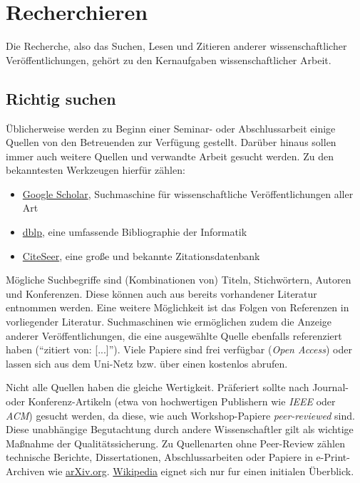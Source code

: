 \section{Recherchieren}
\label{sec:Recherchieren}

Die Recherche, also das Suchen, Lesen und Zitieren anderer wissenschaftlicher Veröffentlichungen, gehört zu den Kernaufgaben wissenschaftlicher Arbeit.

\subsection{Richtig suchen}
\label{sec:Recherchieren:Suchen}

Üblicherweise werden zu Beginn einer Seminar- oder Abschlussarbeit einige Quellen von den Betreuenden zur Verfügung gestellt. 
Darüber hinaus sollen immer auch weitere Quellen und verwandte Arbeit gesucht werden. 
Zu den bekanntesten Werkzeugen hierfür zählen:

\smallskip
\begin{itemize}[label={\symbolTool}]
    \item \href{https://scholar.google.com/}{Google Scholar}, Suchmaschine für wissenschaftliche Veröffentlichungen aller Art
    \item \href{https://dblp.org/}{dblp}, eine umfassende Bibliographie der Informatik
    \item \href{https://citeseerx.ist.psu.edu/}{CiteSeer}, eine große und bekannte Zitationsdatenbank 
\end{itemize}
\smallskip

\noindent
Mögliche Suchbegriffe sind (Kombinationen von) Titeln, Stichwörtern, Autoren und Konferenzen. 
Diese können auch aus bereits vorhandener Literatur entnommen werden. 
Eine weitere Möglichkeit ist das Folgen von Referenzen in vorliegender Literatur. 
Suchmaschinen wie  ermöglichen zudem die Anzeige anderer Veröffentlichungen, die eine ausgewählte Quelle ebenfalls referenziert haben (\enquote{zitiert von: [...]}). 
Viele Papiere sind frei verfügbar (\emph{Open Access}) oder lassen sich aus dem Uni-Netz bzw. über einen  kostenlos abrufen.

Nicht alle Quellen haben die gleiche Wertigkeit. 
Präferiert sollte nach Journal- oder Konferenz-Artikeln (etwa von hochwertigen Publishern wie \emph{IEEE} oder \emph{ACM}) gesucht werden, da diese, wie auch Workshop-Papiere \emph{peer-reviewed} sind. 
Diese unabhängige Begutachtung durch andere Wissenschaftler gilt als wichtige Maßnahme der Qualitätssicherung. 
Zu Quellenarten ohne Peer-Review zählen technische Berichte, Dissertationen, Abschlussarbeiten oder Papiere in e-Print-Archiven wie \href{https://arXiv.org}{arXiv.org}.  
\href{https://www.wikipedia.org/}{Wikipedia} eignet sich nur fur einen initialen Überblick.

